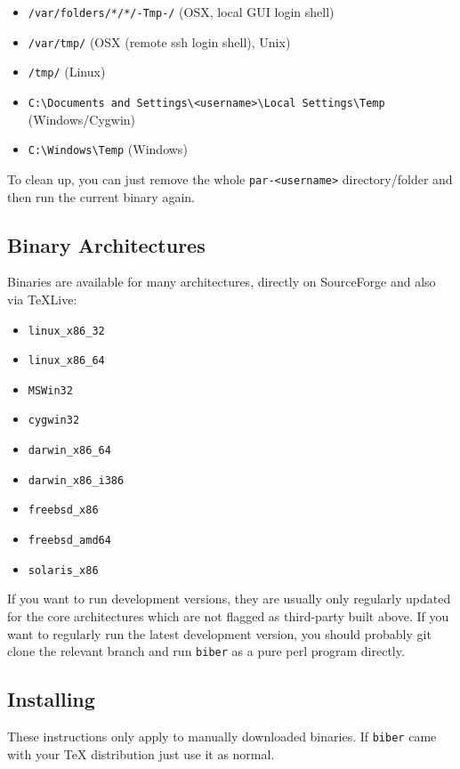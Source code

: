 \documentclass{ltxdockit}
\begin{document}
\begin{itemize}
\item \verb+/var/folders/*/*/-Tmp-/+ (OSX, local GUI login shell)
\item \verb+/var/tmp/+ (OSX (remote ssh login shell), Unix)
\item \verb+/tmp/+ (Linux)
\item \verb+C:\Documents and Settings\<username>\Local Settings\Temp+ (Windows/Cygwin)
\item \verb+C:\Windows\Temp+ (Windows)
\end{itemize}

\noindent To clean up, you can just remove the whole \verb+par-<username>+
directory/folder and then run the current binary again.

\subsection{Binary Architectures}

Binaries are available for many architectures, directly on SourceForge and
also via TeXLive:

\begin{itemize}
\item \verb+linux_x86_32+
\item \verb+linux_x86_64+
\item \verb+MSWin32+
\item \verb+cygwin32+
\item \verb+darwin_x86_64+
\item \verb+darwin_x86_i386+
\item \verb+freebsd_x86+\tpb
\item \verb+freebsd_amd64+\tpb
\item \verb+solaris_x86+\tpb
\end{itemize}

\noindent If you want to run development versions, they are usually only
regularly updated for the core architectures which are not flagged as
third-party built above. If you want to regularly run the latest
development version, you should probably git clone the relevant branch and
run \verb+biber+ as a pure perl program directly.

\subsection{Installing}

These instructions only apply to manually downloaded binaries. If
\verb+biber+ came with your TeX distribution just use it as normal.
\end{document}
